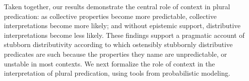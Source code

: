 \documentclass[preprint,12pt,authoryear,titlepage]{elsarticle}
\begin{document}
%

Taken together, our results demonstrate the central role of context in plural predication: as collective properties become more predictable, collective interpretations become more likely; and without epistemic support, distributive interpretations become less likely. These findings support a pragmatic account of stubborn distributivity according to which ostensibly stubbornly distributive predicates are such because the properties they name are unpredictable, or unstable in most contexts. We next formalize the role of context in the interpretation of plural predication, using tools from probabilistic modeling.

\end{document}
